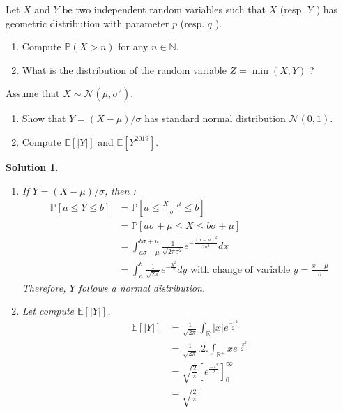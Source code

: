 \documentclass{article}
\newcommand{\proba}[1]{\mathbb{P}[#1]}
\newcommand{\esperance}[1]{\mathbb{E}[#1]}
\newcommand{\R}{\mathbb{R}}
\newtheorem{solution}{Solution}
\begin{document}
\begin{Exercise} Let $X$ and $Y$ be two independent random variables such that $X$ (resp. $Y$ ) has geometric distribution with parameter $p$ (resp. $q$ ).
  \begin{enumerate}
    \item Compute $\mathbb{P}(X>n)$ for any $n \in \mathbb{N}$.
    \item What is the distribution of the random variable $Z=\min (X, Y)$ ?
  \end{enumerate}
\end{Exercise}

\begin{Exercise} Assume that $X \sim \mathcal{N}\left(\mu, \sigma^{2}\right)$.
  \begin{enumerate}
    \item Show that $Y=(X-\mu) / \sigma$ has standard normal distribution
          $\mathcal{N}(0,1)$.
    \item Compute $\mathbb{E}[|Y|]$ and $\mathbb{E}\left[Y^{2019}\right]$.
  \end{enumerate}
\end{Exercise}

\begin{solution}
  \begin{enumerate}
    \item If $Y=(X-\mu)/\sigma$, then :
          \begin{align*}
            \proba{a \leq Y \leq b} & = \proba{a \leq \frac{X-\mu}{\sigma} \leq b}                                                                     \\
                                    & = \proba{a\sigma + \mu \leq X \leq b\sigma + \mu}                                                                \\
                                    & = \int_{a\sigma + \mu}^{b\sigma + \mu} \frac{1}{\sqrt{2\pi \sigma^2}} e^{-\frac{{(x-\mu)}^2}{2\sigma^2}} dx      \\
                                    & = \int_a^b \frac{1}{\sqrt{2\pi}} e^{-\frac{y^2}{2}} dy \text{ with change of variable } y = \frac{x-\mu}{\sigma}
          \end{align*}
          Therefore, $Y$ follows a normal distribution.
    \item Let compute $\esperance{|Y|}$.
          \begin{align*}
            \esperance{|Y|} & = \frac{1}{\sqrt{2\pi}} \int_\R |x| e^{\frac{-x^2}{2}}            \\
                            & = \frac{1}{\sqrt{2\pi}}.2. \int_{\R^+} x e^{\frac{-x^2}{2}}       \\
                            & = \sqrt{\frac{2}{\pi}} \left[ e^{\frac{-x^2}{2}} \right]_0^\infty \\
                            & = \sqrt{\frac{2}{\pi}}
          \end{align*}
  \end{enumerate}
\end{solution}
\end{document}
